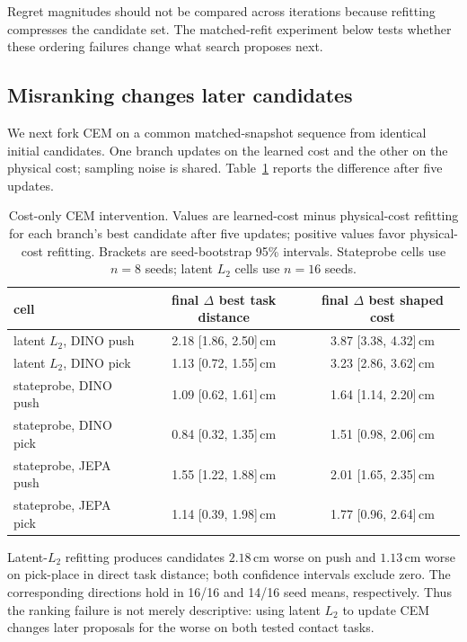 \documentclass[10pt]{article}
\begin{document}
Regret magnitudes should not be compared across iterations because refitting
compresses the candidate set. The matched-refit experiment below tests whether
these ordering failures change what search proposes next.

\subsection{Misranking changes later candidates}\label{sec:branch}

We next fork CEM on a common matched-snapshot sequence from identical initial
candidates. One branch updates on the learned cost and the other on the
physical cost; sampling noise is shared. Table~\ref{tab:branch} reports the
difference after five updates.

\begin{table}[H]
\centering
\small
\caption{Cost-only CEM intervention. Values are learned-cost minus
physical-cost refitting for each branch's best candidate after five updates;
positive values favor physical-cost refitting. Brackets are seed-bootstrap
95\% intervals. Stateprobe cells use $n=8$ seeds; latent $L_2$ cells use
$n=16$ seeds.}
\label{tab:branch}
\begin{tabular}{lcc}
\toprule
cell & final $\Delta$ best task distance & final $\Delta$ best shaped cost \\
\midrule
latent $L_2$, DINO push & 2.18 [1.86, 2.50]\,cm & 3.87 [3.38, 4.32]\,cm \\
latent $L_2$, DINO pick & 1.13 [0.72, 1.55]\,cm & 3.23 [2.86, 3.62]\,cm \\
\midrule
stateprobe, DINO push & 1.09 [0.62, 1.61]\,cm & 1.64 [1.14, 2.20]\,cm \\
stateprobe, DINO pick & 0.84 [0.32, 1.35]\,cm & 1.51 [0.98, 2.06]\,cm \\
stateprobe, JEPA push & 1.55 [1.22, 1.88]\,cm & 2.01 [1.65, 2.35]\,cm \\
stateprobe, JEPA pick & 1.14 [0.39, 1.98]\,cm & 1.77 [0.96, 2.64]\,cm \\
\bottomrule
\end{tabular}
\end{table}

Latent-$L_2$ refitting produces candidates $2.18$\,cm worse on push and
$1.13$\,cm worse on pick-place in direct task distance; both confidence
intervals exclude zero. The corresponding directions hold in 16/16 and 14/16
seed means, respectively. Thus the ranking failure is not merely descriptive:
using latent $L_2$ to update CEM changes later proposals for the worse on both
tested contact tasks.
\end{document}
